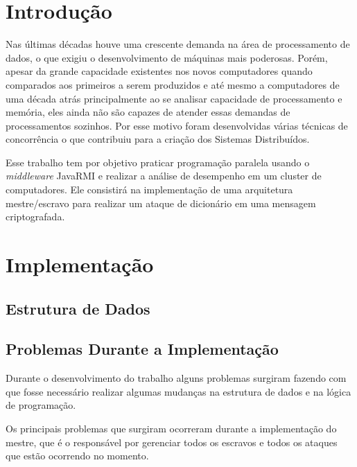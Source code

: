 \documentclass[
	12pt,				%
    oneside,			%
	a4paper,			%
	english,			%
	brazil,				%
	]{abntex2}
\begin{document}
\chapter{Introdução} 
Nas últimas décadas houve uma crescente demanda na área de processamento de dados, o que exigiu o desenvolvimento de máquinas
mais poderosas. Porém, apesar da grande capacidade existentes nos novos computadores quando comparados aos primeiros a serem produzidos e até mesmo a computadores de uma década atrás principalmente ao se analisar capacidade de processamento e memória, eles ainda não são capazes de atender essas demandas de processamentos sozinhos. Por esse motivo foram desenvolvidas várias técnicas de concorrência o que contribuiu para a criação dos Sistemas Distribuídos.


Esse trabalho tem por objetivo praticar programação paralela usando o \textit{middleware} JavaRMI e realizar a análise de desempenho em um cluster de computadores. Ele consistirá na implementação de uma arquitetura mestre/escravo para realizar um ataque de dicionário em uma mensagem criptografada.


\chapter{Implementação} 





\section{Estrutura de Dados}


\section{Problemas Durante a Implementação}
Durante o desenvolvimento do trabalho alguns problemas surgiram fazendo com que fosse necessário realizar algumas mudanças
na estrutura de dados e na lógica de programação. 

Os principais problemas que surgiram ocorreram durante a implementação do mestre, que é o responsável por gerenciar
todos os escravos e todos os ataques que estão ocorrendo no momento.
\end{document}
